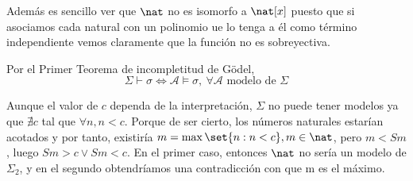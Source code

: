 \begin{problem}
Además es sencillo ver que $\nat$ no es isomorfo a $\nat[x]$ puesto que si asociamos cada natural con un polinomio ue lo tenga a él como término independiente vemos claramente que la función no es sobreyectiva.

\spart

Por el Primer Teorema de incompletitud de Gödel,
\[ \Sigma \vdash \sigma \iff \mathcal{A} \models \sigma, \ \forall \mathcal{A} \text{ modelo de } \Sigma\]

Aunque el valor de $c$ dependa de la interpretación, $\Sigma$ no puede tener modelos ya que $\nexists c $ tal que $\forall n, n < c$. Porque de ser cierto, los números naturales estarían acotados y por tanto, existiría $m = \max\set{ n : n < c}, m \in \nat$, pero $m < Sm$, luego $Sm > c \lor Sm < c$. En el primer caso, entonces $\nat$ no sería un modelo de $\Sigma_2$, y en el segundo obtendríamos una contradicción con que m es el máximo.

\end{problem}
